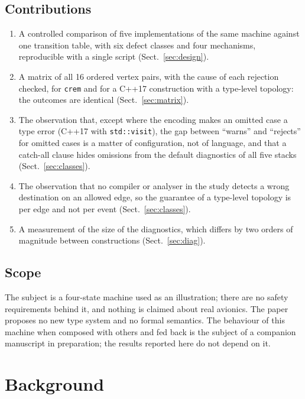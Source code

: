 \documentclass[review,12pt]{elsarticle}
\newcommand{\code}[1]{\texttt{#1}}
\newcommand{\crem}{\texttt{crem}}
\begin{document}
\subsection{Contributions}
\label{sec:contrib}

\begin{enumerate}
\item A controlled comparison of five implementations of the same machine against one transition table, with six defect classes and four mechanisms, reproducible with a single script (Sect.~\ref{sec:design}).
\item A matrix of all 16 ordered vertex pairs, with the cause of each rejection checked, for \crem{} and for a C++17 construction with a type-level topology: the outcomes are identical (Sect.~\ref{sec:matrix}).
\item The observation that, except where the encoding makes an omitted case a type error (C++17 with \code{std::visit}), the gap between ``warns'' and ``rejects'' for omitted cases is a matter of configuration, not of language, and that a catch-all clause hides omissions from the default diagnostics of all five stacks (Sect.~\ref{sec:classes}).
\item The observation that no compiler or analyser in the study detects a wrong destination on an allowed edge, so the guarantee of a type-level topology is per edge and not per event (Sect.~\ref{sec:classes}).
\item A measurement of the size of the diagnostics, which differs by two orders of magnitude between constructions (Sect.~\ref{sec:diag}).
\end{enumerate}

\subsection{Scope}
\label{sec:scope}

The subject is a four-state machine used as an illustration; there are no safety requirements behind it, and nothing is claimed about real avionics. The paper proposes no new type system and no formal semantics. The behaviour of this machine when composed with others and fed back is the subject of a companion manuscript in preparation; the results reported here do not depend on it.

\section{Background}
\label{sec:background}
\end{document}
